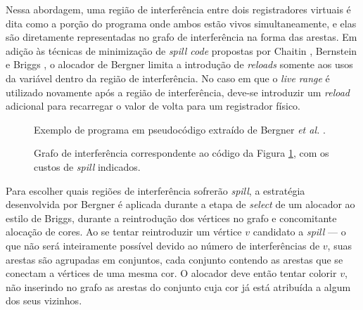 \documentclass[
	12pt,				%
	openright,			%
	twoside,			%
	a4paper,			%
	tcc,			%
	]{ABNT-DC-UEL}
\begin{document}
Nessa abordagem, uma região de interferência entre dois registradores virtuais é dita como a porção do programa onde ambos estão vivos simultaneamente, e elas são diretamente representadas no grafo de interferência na forma das arestas. Em adição às técnicas de minimização de \textit{spill code} propostas por Chaitin \cite{chaitin:81}, Bernstein \cite{bernstein:89} e Briggs \cite{briggs2:92}, o alocador de Bergner limita a introdução de \textit{reloads} somente aos usos da variável dentro da região de interferência. No caso em que o \textit{live range} é utilizado novamente após a região de interferência, deve-se introduzir um \textit{reload} adicional para recarregar o valor de volta para um registrador físico.

\begin{figure}[hbt]
    \centering
    \caption{Exemplo de programa em pseudocódigo extraído de Bergner \textit{et al.} \cite{bergner:97}.}
    \label{fig:bergner-codigo}
\end{figure}

\begin{figure}[hbt]
        \centering
        \caption{Grafo de interferência correspondente ao código da Figura \ref{fig:bergner-codigo}, com os custos de \textit{spill} indicados.}
        \label{fig:bergner-grafo}
    \end{figure}

Para escolher quais regiões de interferência sofrerão \textit{spill}, a estratégia desenvolvida por Bergner é aplicada durante a etapa de \textit{select} de um alocador ao estilo de Briggs, durante a reintrodução dos vértices no grafo e concomitante alocação de cores. Ao se tentar reintroduzir um vértice $v$ candidato a \textit{spill} --- o que não será inteiramente possível devido ao número de interferências de $v$, suas arestas são agrupadas em conjuntos, cada conjunto contendo as arestas que se conectam a vértices de uma mesma cor. O alocador deve então tentar colorir $v$, não inserindo no grafo as arestas do conjunto cuja cor já está atribuída a algum dos seus vizinhos. 
\end{document}
